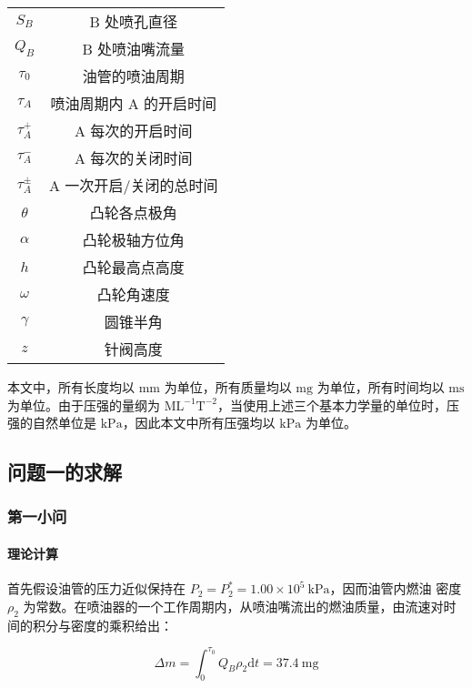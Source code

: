 \documentclass{cumcmthesis}
\begin{document}
\begin{table}[!ht]
\begin{minipage}{\textwidth}
\begin{minipage}[t]{0.5\textwidth}
\begin{tabular}{cc}
$S_B$          & B 处喷孔直径       \\
$Q_B$          & B 处喷油嘴流量      \\
$\tau_0$       & 油管的喷油周期       \\
$\tau_A$       & 喷油周期内 A 的开启时间 \\
$\tau_A^+$     & A 每次的开启时间     \\
$\tau_A^-$     & A 每次的关闭时间     \\
$\tau_A^{\pm}$ & A 一次开启/关闭的总时间 \\
$\theta$       & 凸轮各点极角        \\
$\alpha$       & 凸轮极轴方位角       \\
$h$            & 凸轮最高点高度       \\
$\omega$       & 凸轮角速度         \\
$\gamma$       & 圆锥半角          \\
$z$            & 针阀高度          \\ \bottomrule				
				
				
				
			\end{tabular}
		\end{minipage}
	\end{minipage}
\end{table}
本文中，所有长度均以 $\mathrm{mm}$ 为单位，所有质量均以 $\mathrm{mg}$ 为单位，所有时间均以 $\mathrm{ms}$ 为单位。由于压强的量纲为 $\mathrm{ML^{-1}T^{-2}}$，当使用上述三个基本力学量的单位时，压强的自然单位是 $\mathrm{kPa}$，因此本文中所有压强均以 $\mathrm{kPa}$ 为单位。


\newpage


\subsection{问题一的求解}
\subsubsection{第一小问}
\paragraph{理论计算}
首先假设油管的压力近似保持在 $P_2=P_2^*=1.00\times 10^5~\mathrm{kPa}$，因而油管内燃油 密度 $\rho_2$ 为常数。在喷油器的一个工作周期内，从喷油嘴流出的燃油质量，由流速对时间的积分与密度的乘积给出：

$$
\Delta m=\int_0^{\tau_0}Q_B\rho_2\mathrm dt=37.4~\mathrm{mg}
$$
\end{document}
